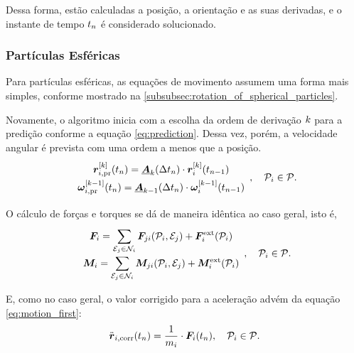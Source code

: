 Dessa forma, estão calculadas a posição, a orientação e as suas derivadas, e o instante de tempo \(\instant[n]\) é considerado solucionado.

\subsubsection*{Partículas Esféricas}

Para partículas esféricas, as equações de movimento assumem uma forma mais simples, conforme mostrado na \autoref{subsubsec:rotation_of_spherical_particles}. 

Novamente, o algoritmo inicia com a escolha da ordem de derivação \(\taylorOrder\) para a predição conforme a equação \eqref{eq:prediction}. Dessa vez, porém, a velocidade angular é prevista com uma ordem a menos que a posição.
\begin{equation*}
	\def\arraystretch{1.5}
	\begin{array}{c}
		\drvec{\taylorOrder}{\positionipr}\pqty{\instant[n]} = \extrapolationMatrix{\taylorOrder}[\Dt[n]]\cdot\drvec{\taylorOrder}{\positioni}\pqty{\instant[n-1]} \\
		\drvec{\taylorOrder-1}{\angularVelocityipr}\pqty{\instant[n]} = \extrapolationMatrix{\taylorOrder-1}[\Dt[n]]\cdot\drvec{\taylorOrder-1}{\angularVelocityi}\pqty{\instant[n-1]} \\
	\end{array}, \quad \particlei\in\particleSet.
\end{equation*}

O cálculo de forças e torques se dá de maneira idêntica ao caso geral, isto é,
\begin{equation*}
	\def\arraystretch{1.5}
	\begin{array}{c}
		\resultingForcei = \dsum_{\elementj\in\neighborhoodi}\forceji\pqty{\particlei, \elementj} + \external\forcei\pqty{\particlei}\\
		\resultingTorquei = \dsum_{\elementj\in\neighborhoodi}\torqueji\pqty{\particlei, \elementj} + \external\torquei\pqty{\particlei}
	\end{array}, \quad \particlei\in\particleSet.
\end{equation*}

E, como no caso geral, o valor corrigido para a aceleração advém da equação \eqref{eq:motion_first}:
\begin{equation*}
	\accelerationicorr\pqty{\instant[n]} = \dfrac{1}{\massi}\cdot\resultingForcei\pqty{\instant[n]}, \quad\particlei\in\particleSet.
\end{equation*}

